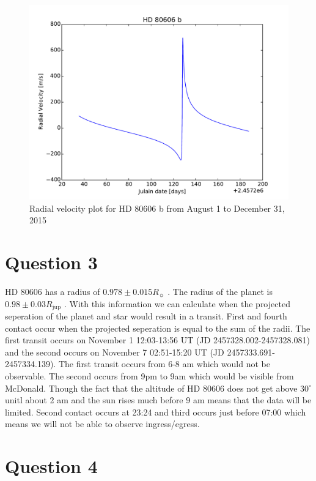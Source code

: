 \documentclass[preprint]{aastex}
\begin{document}
\begin{figure}[h]
\begin{center}
    \includegraphics[width=\textwidth]{Q2.pdf}
    \caption{Radial velocity plot for HD 80606 b from August 1 to December 31, 2015}
    \label{fig:RV}
\end{center}
\end{figure}

\section{Question 3}

HD 80606 has a radius of $0.978\pm0.015 R_\sun$ \citep{orbparam}. The radius of the planet is $0.98\pm0.03 R_\mathrm{jup}$ \citep{orbparam}. With this information we can calculate when the projected seperation of the planet and star would result in a transit. First and fourth contact occur when the projected seperation is equal to the sum of the radii. The first transit occurs on November 1 12:03-13:56 UT (JD 2457328.002-2457328.081) and the second occurs on November 7 02:51-15:20 UT (JD 2457333.691-2457334.139). The first transit occurs from 6-8 am which would not be observable. The second occurs from 9pm to 9am which would be visible from McDonald. Though the fact that the altitude of HD 80606 does not get above $30^\circ$ unitl about 2 am and the sun rises much before 9 am means that the data will be limited. Second contact occurs at 23:24 and third occurs just before 07:00 which means we will not be able to observe ingress/egress.

\section{Question 4}
\end{document}
